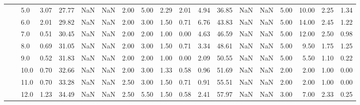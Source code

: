 \begin{tabular}{lllrrrrrrrrrrrrrrrr}
          &     & 5.0  &      3.07 &      27.77 &               NaN &                NaN &  2.00 &   5.00 &             2.29 &                         2.01 &      4.94 &      36.85 &               NaN &                NaN &  5.00 &  10.00 &             2.25 &                         1.34 \\
          &     & 6.0  &      2.01 &      29.82 &               NaN &                NaN &  2.00 &   3.00 &             1.50 &                         0.71 &      6.76 &      43.83 &               NaN &                NaN &  5.00 &  14.00 &             2.45 &                         1.22 \\
          &     & 7.0  &      0.51 &      30.45 &               NaN &                NaN &  2.00 &   2.00 &             1.00 &                         0.00 &      4.63 &      46.59 &               NaN &                NaN &  5.00 &  12.00 &             2.50 &                         0.98 \\
          &     & 8.0  &      0.69 &      31.05 &               NaN &                NaN &  2.00 &   3.00 &             1.50 &                         0.71 &      3.34 &      48.61 &               NaN &                NaN &  5.00 &   9.50 &             1.75 &                         1.25 \\
          &     & 9.0  &      0.52 &      31.83 &               NaN &                NaN &  2.00 &   2.00 &             1.00 &                         0.00 &      2.09 &      50.55 &               NaN &                NaN &  5.00 &   5.50 &             1.10 &                         0.22 \\
          &     & 10.0 &      0.70 &      32.66 &               NaN &                NaN &  2.00 &   3.00 &             1.33 &                         0.58 &      0.96 &      51.69 &               NaN &                NaN &  2.00 &   2.00 &             1.00 &                         0.00 \\
          &     & 11.0 &      0.70 &      33.28 &               NaN &                NaN &  2.50 &   3.00 &             1.50 &                         0.71 &      0.91 &      55.51 &               NaN &                NaN &  2.00 &   2.00 &             1.00 &                         0.00 \\
          &     & 12.0 &      1.23 &      34.49 &               NaN &                NaN &  2.50 &   5.50 &             1.50 &                         0.58 &      2.41 &      57.97 &               NaN &                NaN &  3.00 &   7.00 &             2.33 &                         0.25 \\

\end{tabular}

